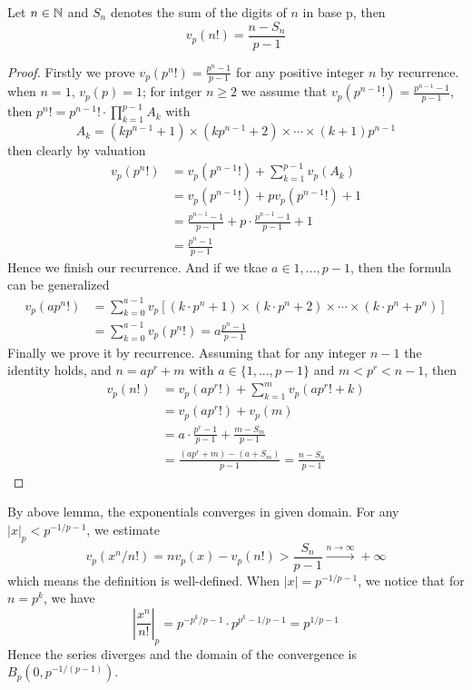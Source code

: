 \begin{lemma}
    Let \(n \in \mathbb{N}\) and \(S_n\) denotes the sum of the digits of \(n\) in base p, then 
    \[v_p(n!) =  \frac{n-S_n}{p-1}\]

    \begin{proof}
        Firstly we prove \(v_p(p^n!) = \frac{p^n-1}{p-1}\) for any positive integer \(n\) by recurrence. when \(n=1\), \(v_p(p) = 1\); for intger \(n \geq 2\) we assume that \(v_p(p^{n-1}!) = \frac{p^{n-1}-1}{p-1}\), then \(p^n! = p^{n-1}! \cdot \prod_{k=1}^{p-1} A_k\) with
        \[A_k = (kp^{n-1}+1) \times (kp^{n-1}+2)\times \cdots \times (k+1)p^{n-1}\]
        then clearly by valuation
        \begin{align*}
            v_p(p^n !) &= v_p(p^{n-1}!) + \sum_{k=1}^{p-1}v_p(A_k)\\
            &= v_p(p^{n-1}!) + pv_p(p^{n-1}!)+1 \\
            &= \frac{p^{n-1}-1}{p-1}+p\cdot \frac{p^{n-1}-1}{p-1} +1 \\
            &= \frac{p^{n}-1}{p-1}
        \end{align*}
        Hence we finish our recurrence. And if we tkae \(a \in {1,...,p-1}\), then the formula can be generalized
        \begin{align*}
            v_p(ap^n !) &= \sum_{k=0}^{a-1}v_p[(k\cdot p^n +1)\times(k\cdot p^n +2) \times \cdots \times  (k\cdot p^n + p^n)] \\
            &= \sum_{k=0}^{a-1}v_p(p^n!) = a\frac{p^n-1}{p-1}
        \end{align*}
        Finally we prove it by recurrence. Assuming that for any integer \(n-1\) the identity holds, and \(n= ap^r+m\) with \(a \in \{1,...,p-1\} \) and \(m<p^r<n-1\), then
        \begin{align*}
            v_p(n!) &= v_p(ap^r!)+\sum_{k=1}^{m}v_p(ap^r!+k)\\
            &= v_p(ap^r!)+v_p(m) \\
            &= a\cdot \frac{p^r-1}{p-1}+\frac{m-S_m}{p-1}\\
            &= \frac{(ap^r+m)-(a+S_m)}{p-1} = \frac{n-S_n}{p-1}
        \end{align*}
    \end{proof}
\end{lemma}

By above lemma, the exponentials converges in given domain. For any \(|x|_p < p^{-1/p-1}\), we estimate
\[v_p(x^n/n!) = nv_p(x)-v_p(n!) > \frac{S_n}{p-1} \xrightarrow{n \rightarrow \infty} +\infty\]
which means the definition is well-defined. When \(|x| = p^{-1/p-1}\), we notice that for \(n = p^k\), we have
\[|\frac{x^n}{n!}|_p  = p^{-p^k/p-1}\cdot p^{p^k-1/p-1} = p^{1/p-1} \]
Hence  the series diverges and the domain of the convergence is \(B_p(0,p^{-1/(p-1)})\). 
\newline

